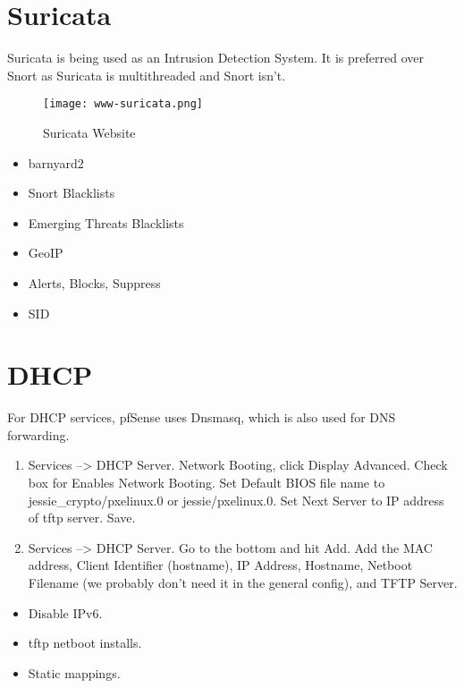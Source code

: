 \section{Suricata}
Suricata is being used as an Intrusion Detection System.
It is preferred over Snort as Suricata is multithreaded and Snort isn't.

\begin{figure}[h!]
\begin{center}
\texttt{[image: www-suricata.png]}
 \caption{Suricata Website}
 \label{fig:www-suricata}
\end{center}
\end{figure}

\begin{itemize}
 \item barnyard2
 \item Snort Blacklists
 \item Emerging Threats Blacklists
 \item GeoIP
 \item Alerts, Blocks, Suppress
 \item SID
\end{itemize}


\section{DHCP}
For DHCP services, pfSense uses Dnsmasq, which is also used for DNS
forwarding.


\begin{enumerate}
 \item Services --> DHCP Server. Network Booting, click Display Advanced. Check box for Enables Network Booting. Set Default BIOS file name to jessie\_crypto/pxelinux.0 or jessie/pxelinux.0. Set Next Server to IP address of tftp server. Save.
 \item Services --> DHCP Server. Go to the bottom and hit Add. Add the MAC address, Client Identifier (hostname), IP Address, Hostname, Netboot Filename (we probably don't need it in the general config), and TFTP Server.
\end{enumerate}

\begin{itemize}
 \item Disable IPv6.
 \item tftp netboot installs.
 \item Static mappings.
\end{itemize}


